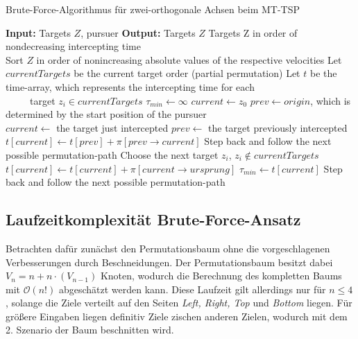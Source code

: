 \documentclass[german,version-2019-11]{uzl-thesis}
\begin{document}
\begin{minipage}{1\linewidth}
\begin{algorithm}[H]
\begin{algorithmic}
\caption{Brute-Force-Algorithmus für zwei-orthogonale Achsen beim MT-TSP}
\label{alg:BF}
\State \textbf{Input:} Targets $Z$, pursuer
\State \textbf{Output:} Targets $Z$ Targets Z in order of nondecreasing intercepting time\\

\State Sort $Z$ in order of nonincreasing absolute values of the respective velocities
\State Let $currentTargets$ be the current target order (partial permutation)
\State Let $t$ be the time-array, which represents the intercepting time for each \\
~~~~~target $z_i\in currentTargets$ 
\State $\tau_{min}\leftarrow \infty$
\State $current\leftarrow z_0$
\State $prev\leftarrow origin$, which is determined by the start position of the pursuer\\

\State $current\leftarrow$ the target just intercepted
\State $prev\leftarrow$ the target previously intercepted 
\State $t[current] \leftarrow t[prev] + \pi[prev\rightarrow current]$
\State Step back and follow the next possible permutation-path
\Else
{}
\State Choose the next target $z_i$, $z_i\notin currentTargets$
\Else
\State $t[current]\leftarrow t[current] + \pi[current\rightarrow ursprung]$ 
\State $\tau_{min}\leftarrow t[current]$
\State Step back and follow the next possible permutation-path
\EndIf 
\EndIf
\EndIf
\EndWhile
\end{algorithmic}
\end{algorithm}
\end{minipage}

\subsection{Laufzeitkomplexität Brute-Force-Ansatz}
Betrachten dafür zunächst den Permutationsbaum ohne die vorgeschlagenen Verbesserungen durch Beschneidungen. Der Permutationsbaum besitzt dabei $V_n = n + n\cdot (V_{n-1})$ Knoten, wodurch die Berechnung des kompletten Baums mit $\mathcal{O}(n!)$ abgeschätzt werden kann. 
Diese Laufzeit gilt allerdings nur für $n\leq 4$, solange die Ziele verteilt auf den Seiten \emph{Left, Right, Top} und \emph{Bottom} liegen. Für größere Eingaben liegen definitiv Ziele zischen anderen Zielen, wodurch mit dem 2. Szenario der Baum beschnitten wird. 
\end{document}

